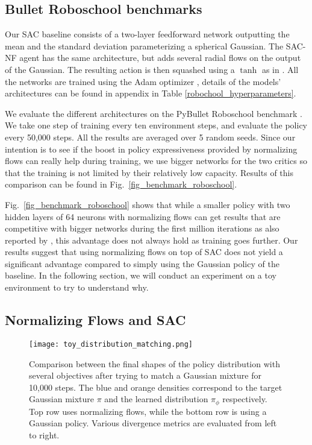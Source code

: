 \documentclass[letterpaper]{article} \usepackage{aaai20}  \usepackage{times}  \usepackage{helvet} \usepackage{courier}  \usepackage[hyphens]{url}  \usepackage{graphicx} \urlstyle{rm} \def\UrlFont{\rm}  \usepackage{graphicx}  \usepackage[section]{placeins}
\begin{document}
\subsection{Bullet Roboschool benchmarks}

Our SAC baseline consists of a two-layer feedforward network outputting the mean and the standard deviation parameterizing a spherical Gaussian. The SAC-NF agent has the same architecture, but adds several radial flows on the output of the Gaussian. The resulting action is then squashed using a $\tanh$ as in \cite{haarnoja2018soft}. All the networks are trained using the Adam optimizer \cite{kingma2014adam}, details of the models' architectures can be found in appendix in Table \ref{robochool_hyperparameters}.

We evaluate the different architectures on the PyBullet Roboschool benchmark \cite{coumans2016pybullet}. We take one step of training every ten environment steps, and evaluate the policy every 50,000 steps. All the results are averaged over 5 random seeds. Since our intention is to see if the boost in policy expressiveness provided by normalizing flows can really help during training, we use bigger networks for the two critics so that the training is not limited by their relatively low capacity. Results of this comparison can be found in Fig.~\ref{fig_benchmark_roboschool}. 

Fig.~\ref{fig_benchmark_roboschool} shows that while a smaller policy with two hidden layers of 64 neurons with normalizing flows can get results that are competitive with bigger networks during the first million iterations as also reported by \cite{mazoure2019leveraging}, this advantage does not always hold as training goes further. Our results suggest that using normalizing flows on top of SAC does not yield a significant advantage compared to simply using the Gaussian policy of the baseline. In the following section, we will conduct an experiment on a toy environment to try to understand why.

\subsection{Normalizing Flows and SAC}

\begin{figure*}[h]
\centering
\texttt{[image: toy\_distribution\_matching.png]} \caption{Comparison between the final shapes of the policy distribution with several objectives after trying to match a Gaussian mixture for 10,000 steps. The blue and orange densities correspond to the target Gaussian mixture $\pi$ and the learned distribution $\pi_{\phi}$ respectively.
Top row uses normalizing flows, while the bottom row is using a Gaussian policy.
Various divergence metrics are evaluated from left to right.
}
\label{fig_toy_distribution_matching}
\end{figure*}
\end{document}
